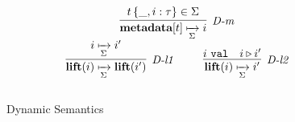 %

\begin{figure}[t]
\centering
\[
\begin{array}{c}
\infer[\textit{D-m}]
	{\keyw{metadata}[t] \xmapsto[\Sigma]{} i} 
	{t\,\{\_,i:\tau\} \in \Sigma}\\[1ex]

\infer[\textit{D-l1}]
	{\keyw{lift}(i) \xmapsto[\Sigma]{} \keyw{lift}(i') } 
	{i \xmapsto[\Sigma]{} i'}
~~~~~~~~
\infer[\textit{D-l2}]
	{\keyw{lift}(i) \xmapsto[\Sigma]{} i' } 
	{i\ \texttt{val} &i \triangleright i' }\\[3ex]
\end{array}
\]
\label{fig:dynsemantics}
\vspace{-15px}
\caption{Dynamic Semantics }
\end{figure}


